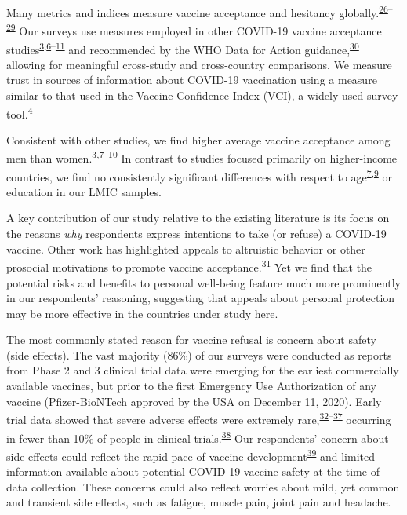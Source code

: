 \documentclass[
  12pt,
]{article}
\begin{document}
Many metrics and indices measure vaccine acceptance and hesitancy globally.\textsuperscript{\protect\hyperlink{ref-betsch2018beyond}{26}--\protect\hyperlink{ref-gilkey2014vaccination}{29}} Our surveys use measures employed in other COVID-19 vaccine acceptance studies\textsuperscript{\protect\hyperlink{ref-wouters2021challenges}{3},\protect\hyperlink{ref-Malik2020}{6}--\protect\hyperlink{ref-lazarus2020nature}{11}} and recommended by the WHO Data for Action guidance,\textsuperscript{\protect\hyperlink{ref-whodata}{30}} allowing for meaningful cross-study and cross-country comparisons. We measure trust in sources of information about COVID-19 vaccination using a measure similar to that used in the Vaccine Confidence Index (VCI), a widely used survey tool.\textsuperscript{\protect\hyperlink{ref-defigueiredo2020lancet}{4}}

Consistent with other studies, we find higher average vaccine acceptance among men than women.\textsuperscript{\protect\hyperlink{ref-wouters2021challenges}{3},\protect\hyperlink{ref-kreps2020factors}{7}--\protect\hyperlink{ref-fisher2020attitudes}{10}} In contrast to studies focused primarily on higher-income countries, we find no consistently significant differences with respect to age\textsuperscript{\protect\hyperlink{ref-kreps2020factors}{7},\protect\hyperlink{ref-dror2020vaccine}{9}} or education in our LMIC samples.

A key contribution of our study relative to the existing literature is its focus on the reasons \emph{why} respondents express intentions to take (or refuse) a COVID-19 vaccine. Other work has highlighted appeals to altruistic behavior or other prosocial motivations to promote vaccine acceptance.\textsuperscript{\protect\hyperlink{ref-chou2020considering}{31}} Yet we find that the potential risks and benefits to personal well-being feature much more prominently in our respondents' reasoning, suggesting that appeals about personal protection may be more effective in the countries under study here.

The most commonly stated reason for vaccine refusal is concern about safety (side effects). The vast majority (86\%) of our surveys were conducted as reports from Phase 2 and 3 clinical trial data were emerging for the earliest commercially available vaccines, but prior to the first Emergency Use Authorization of any vaccine (Pfizer-BioNTech approved by the USA on December 11, 2020). Early trial data showed that severe adverse effects were extremely rare,\textsuperscript{\protect\hyperlink{ref-mulligan2020phase}{32}--\protect\hyperlink{ref-polack2020safety}{37}} occurring in fewer than 10\% of people in clinical trials.\textsuperscript{\protect\hyperlink{ref-wadman2020public}{38}} Our respondents' concern about side effects could reflect the rapid pace of vaccine development\textsuperscript{\protect\hyperlink{ref-callaway2020russia}{39}} and limited information available about potential COVID-19 vaccine safety at the time of data collection. These concerns could also reflect worries about mild, yet common and transient side effects, such as fatigue, muscle pain, joint pain and headache.
\end{document}

